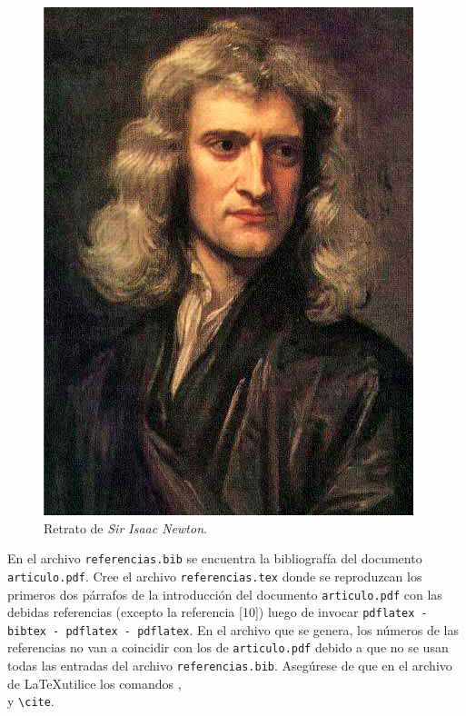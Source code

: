 \documentclass[12pt, letter]{exam}
\begin{document}
\begin{questions}
\begin{mdframed}[style=mystyle]
\begin{figure}[H]
\includegraphics[scale=0.2, angle=100]{isaac}
\caption{Retrato de \textit{Sir Isaac Newton}.}
\label{fig:Isaac}
\end{figure}
\end{mdframed}

\question{} En el archivo \verb"referencias.bib" se encuentra la bibliografía del documento \verb|articulo.pdf|. Cree el archivo \verb+referencias.tex+ donde se reproduzcan los primeros dos p\'arrafos de la introducci\'on del documento \verb|articulo.pdf| con las debidas referencias (excepto la referencia [10]) luego de invocar \verb+pdflatex - bibtex - pdflatex - pdflatex+. En el archivo que se genera, los n\'umeros de las referencias no van a coincidir con los de \verb|articulo.pdf| debido a que no se usan todas las entradas del archivo \verb|referencias.bib|. Aseg\'urese de que en el archivo de \LaTeX \hspace{2pt}utilice los comandos \verb++,\\ \verb++ y \verb+\cite+.

\end{questions}
\end{document}
